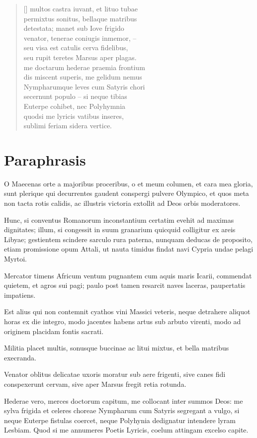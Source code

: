 \begin{verse}[\versewidth]
{multos castra iuvant, et lituo tubae\\
permixtus sonitus, bellaque matribus\\
detestata; manet sub Iove frigido\\
venator, tenerae coniugis inmemor, –\\
seu visa est catulis cerva fidelibus,\\
seu rupit teretes Marsus aper plagas.\\
me doctarum hederae praemia frontium\\
dis miscent superis, me gelidum nemus\\
Nympharumque leves cum Satyris chori\\
secernunt populo – si neque tibias\\
Euterpe cohibet, nec Polyhymnia\\
quodsi me lyricis vatibus inseres,\\
sublimi feriam sidera vertice. \\

}
\end{verse}

\newpage

\section*{Paraphrasis}

{
\setlength{\parindent}{0pt}

O Maecenas orte a majoribus proceribus, o et meum columen, et cara mea gloria, sunt plerique qui decurrentes gaudent conspergi pulvere Olympico, et quos meta non tacta rotis calidis, ac illustris victoria extollit ad Deos orbis moderatores. 

Hunc, si conventus Romanorum inconstantium certatim evehit ad maximas dignitates; illum, si congessit in suum granarium quicquid colligitur ex areis Libyae; gestientem scindere sarculo rura paterna, nunquam deducas de proposito, etiam promissione opum Attali, ut nauta timidus findat navi Cypria undae pelagi Myrtoi. 

Mercator timens Africum ventum pugnantem cum aquis maris Icarii, commendat quietem, et agros sui pagi; paulo post tamen resarcit naves laceras, paupertatis impatiens. 

Est alius qui non contemnit cyathos vini Massici veteris, neque detrahere aliquot horas ex die integro, modo jacentes habens artus sub arbuto virenti, modo ad originem placidam fontis sacrati. 

Militia placet multis, sonusque buccinae ac litui mixtus, et bella matribus execranda. 

Venator oblitus delicatae uxoris moratur sub aere frigenti, sive canes fidi conspexerunt cervam, sive aper Marsus fregit retia rotunda. 

Hederae vero, merces doctorum capitum, me collocant inter summos Deos: me sylva frigida et celeres choreae Nympharum cum Satyris segregant a vulgo, si neque Euterpe fistulas coercet, neque Polyhynia dedignatur intendere lyram Lesbiam. Quod si me annumeres Poetis Lyricis, coelum attingam excelso capite.


}
